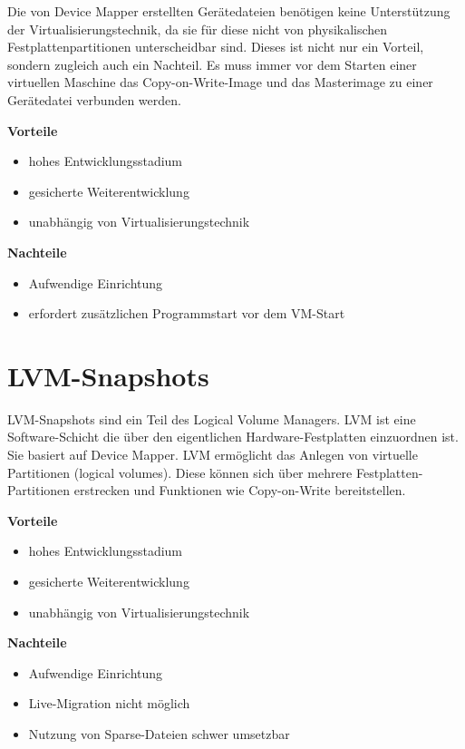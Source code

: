 Die von Device Mapper erstellten Gerätedateien benötigen keine Unterstützung der Virtualisierungstechnik, da sie für diese nicht von physikalischen Festplattenpartitionen unterscheidbar sind. Dieses ist nicht nur ein Vorteil, sondern zugleich auch ein Nachteil. Es muss immer vor dem Starten einer virtuellen Maschine das Copy-on-Write-Image und das Masterimage zu einer Gerätedatei verbunden werden. \cite{dmmbroz} \cite{dmkerneldoc}

\textbf{Vorteile}
\begin{itemize}
 \item hohes Entwicklungsstadium
 \item gesicherte Weiterentwicklung
 \item unabhängig von Virtualisierungstechnik
\end{itemize}

\textbf{Nachteile}
\begin{itemize}
 \item Aufwendige Einrichtung
 \item erfordert zusätzlichen Programmstart vor dem VM-Start
\end{itemize}

\section{LVM-Snapshots}
LVM-Snapshots sind ein Teil des Logical Volume Managers. LVM ist eine Software-Schicht die über den eigentlichen Hardware-Festplatten einzuordnen ist. Sie basiert auf Device Mapper. LVM ermöglicht das Anlegen von virtuelle Partitionen (logical volumes). Diese können sich über mehrere Festplatten-Partitionen erstrecken und Funktionen wie Copy-on-Write bereitstellen. \cite{lvmhowto} \cite{lvmselflinux} \cite{lvmsource}

\textbf{Vorteile}
\begin{itemize}
 \item hohes Entwicklungsstadium
 \item gesicherte Weiterentwicklung
 \item unabhängig von Virtualisierungstechnik
\end{itemize}

\textbf{Nachteile}
\begin{itemize}
 \item Aufwendige Einrichtung
 \item Live-Migration nicht möglich
 \item Nutzung von Sparse-Dateien schwer umsetzbar
\end{itemize}

